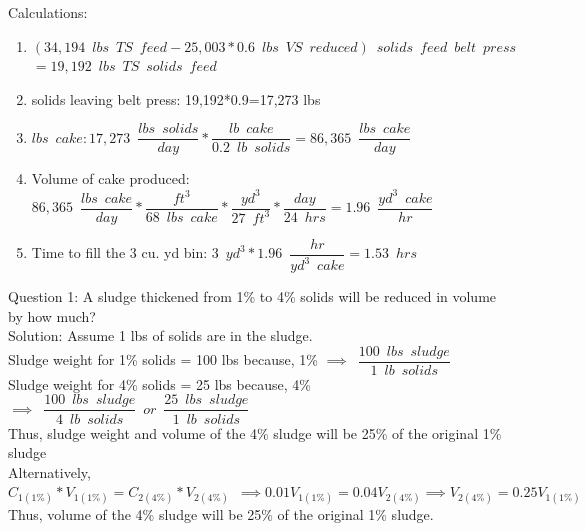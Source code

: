 \documentclass{article}
\begin{document}
\begin{enumerate}
\begin{enumerate}
Calculations:\\
\begin{enumerate}
\item $(34,194 \enspace lbs \enspace TS \enspace feed - 25,003*0.6 \enspace lbs \enspace VS \enspace reduced)\enspace solids \enspace feed \enspace belt \enspace press$\\
$=19,192 \enspace lbs \enspace TS \enspace solids \enspace feed$\\
\item solids leaving belt press: 19,192*0.9=17,273 lbs\\
\item $lbs \enspace cake: 17,273 \enspace \dfrac{lbs \enspace solids}{day}*\dfrac{lb \enspace cake}{0.2 \enspace lb \enspace solids}=86,365 \enspace \dfrac{lbs \enspace cake}{day}$\\
\item Volume of cake produced: $86,365 \enspace \dfrac{lbs \enspace cake}{day}*\dfrac{ft^3}{68 \enspace lbs \enspace cake}*\dfrac{yd^3}{27 \enspace ft^3}*\dfrac{day}{24 \enspace hrs} =1.96 \enspace \dfrac{yd^3 \enspace cake}{hr}$
\item Time to fill the 3 cu. yd bin: $3 \enspace yd^3 *1.96 \enspace \dfrac{hr}{yd^3 \enspace cake}=\boxed{1.53 \enspace hrs}$


\end{enumerate}

\end{enumerate}

Question 1: A sludge thickened from 1\% to 4\% solids will be reduced in volume by how much?\\
Solution:  Assume 1 lbs of solids are in the sludge.\\
Sludge weight for 1\% solids = 100 lbs because, 1\% $\implies \enspace \dfrac{100 \enspace lbs \enspace sludge}{1 \enspace lb \enspace solids}$\\
Sludge weight for 4\% solids = 25 lbs because, 4\% $\implies \enspace \dfrac{100 \enspace lbs \enspace sludge}{4 \enspace lb \enspace solids} \enspace or \enspace \dfrac{25 \enspace lbs \enspace sludge}{1 \enspace lb \enspace solids}$\\
Thus, sludge weight and volume of the 4\% sludge will be 25\% of the original 1\% sludge\\
\vspace{0.5cm}
Alternatively, $C_{1(1\%)}*V_{1(1\%)}=C_{2(4\%)}*V_{2(4\%)} \enspace \implies 0.01V_{1(1\%)}=0.04V_{2(4\%)} \implies V_{2(4\%)}=0.25V_{1(1\%)}$ \\
Thus, volume of the 4\% sludge will be 25\% of the original 1\% sludge.
\vspace{0.5cm}


\end{enumerate}
\end{document}
